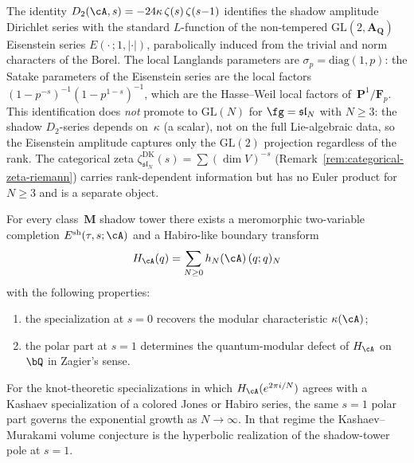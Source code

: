 \begin{remark}
\label{rem:langlands-gl2-eisenstein}
The identity $D_2(\cA, s) = -24\kappa\,\zeta(s)\,\zeta(s{-}1)$
identifies the shadow amplitude Dirichlet series with the
standard $L$-function of the non-tempered
$\mathrm{GL}(2, \mathbf{A}_{\mathbf{Q}})$ Eisenstein series
$E(\cdot\,; 1, |\cdot|)$, parabolically induced from the trivial
and norm characters of the Borel. The local Langlands
parameters are $\sigma_p = \mathrm{diag}(1, p)$: the Satake
parameters of the Eisenstein series are the local factors
$(1 - p^{-s})^{-1}(1 - p^{1-s})^{-1}$, which are the
Hasse--Weil local factors of~$\mathbf{P}^1/\mathbf{F}_p$.
This identification does \emph{not} promote to $\mathrm{GL}(N)$
for $\fg = \mathfrak{sl}_N$ with $N \geq 3$: the shadow
$D_2$-series depends on~$\kappa$ (a scalar), not on the full
Lie-algebraic data, so the Eisenstein amplitude captures only the
$\mathrm{GL}(2)$ projection regardless of the rank.
The categorical zeta
$\zeta^{\mathrm{DK}}_{\mathfrak{sl}_N}(s)
= \sum (\dim V)^{-s}$
(Remark~\ref{rem:categorical-zeta-riemann}) carries
rank-dependent information but has no Euler product for $N \geq 3$
and is a separate object.
\end{remark}

\begin{conjecture}[The $s=1$ shadow pole, quantum modularity,
and volume growth]%
\label{conj:shadow-s1-quantum-volume}%
\ClaimStatusConjectured%
For every class~$\mathbf{M}$ shadow tower there exists a
meromorphic two-variable completion
$E^{\mathrm{sh}}(\tau,s;\cA)$ and a Habiro-like boundary
transform
\[
 H_\cA(q) = \sum_{N \ge 0} h_N(\cA)\,(q;q)_N
\]
with the following properties:
\begin{enumerate}[label=\textup{(\roman*)}]
\item the specialization at $s=0$ recovers the modular
 characteristic $\kappa(\cA)$;
\item the polar part at $s = 1$ determines the
 quantum-modular defect of $H_\cA$ on~$\bQ$ in Zagier's
 sense.
\end{enumerate}
For the knot-theoretic specializations in which
$H_\cA(e^{2\pi i/N})$ agrees with a Kashaev specialization of a
colored Jones or Habiro series, the same $s=1$ polar part
governs the exponential growth as $N \to \infty$. In that
regime the Kashaev--Murakami volume conjecture is the
hyperbolic realization of the shadow-tower pole at $s = 1$.
\end{conjecture}

